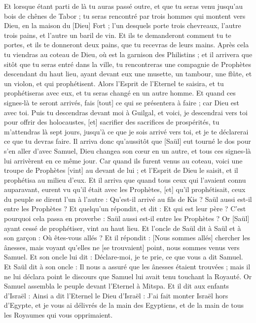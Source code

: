 \begin{multicols}{2}
Et lorsque étant parti de là tu auras passé outre, et que tu seras venu jusqu'au bois de chênes de Tabor ; tu seras rencontré par trois hommes qui montent vers Dieu, en la maison du [Dieu] Fort ; l'un desquels porte trois chevreaux, l'autre trois pains, et l'autre un baril de vin.
Et ils te demanderont comment tu te portes, et ils te donneront deux pains, que tu recevras de leurs mains.
Après cela tu viendras au coteau de Dieu, où est la garnison des Philistins ; et il arrivera que sitôt que tu seras entré dans la ville, tu rencontreras une compagnie de Prophètes descendant du haut lieu, ayant devant eux une musette, un tambour, une flûte, et un violon, et qui prophétisent.
Alors l'Esprit de l'Eternel te saisira, et tu prophétiseras avec eux, et tu seras changé en un autre homme.
Et quand ces signes-là te seront arrivés, fais [tout] ce qui se présentera à faire ; car Dieu est avec toi.
Puis tu descendras devant moi à Guilgal, et voici, je descendrai vers toi pour offrir des holocaustes, [et] sacrifier des sacrifices de prospérités, tu m'attendras là sept jours, jusqu'à ce que je sois arrivé vers toi, et je te déclarerai ce que tu devras faire.
Il arriva donc qu'aussitôt que [Saül] eut tourné le dos pour s'en aller d'avec Samuel, Dieu changea son cœur en un autre, et tous ces signes-là lui arrivèrent en ce même jour.
Car quand ils furent venus au coteau, voici une troupe de Prophètes [vint] au devant de lui ; et l'Esprit de Dieu le saisit, et il prophétisa au milieu d'eux.
Et il arriva que quand tous ceux qui l'avaient connu auparavant, eurent vu qu'il était avec les Prophètes, [et] qu'il prophétisait, ceux du peuple se dirent l'un à l'autre : Qu'est-il arrivé au fils de Kis ? Saül aussi est-il entre les Prophètes ?
Et quelqu'un répondit, et dit : Et qui est leur père ? C'est pourquoi cela passa en proverbe : Saül aussi est-il entre les Prophètes ?
Or [Saül] ayant cessé de prophétiser, vint au haut lieu.
Et l'oncle de Saül dit à Saül et à son garçon : Où êtes-vous allés ? Et il répondit : [Nous sommes allés] chercher les ânesses, mais voyant qu'elles ne [se trouvaient] point, nous sommes venus vers Samuel.
Et son oncle lui dit : Déclare-moi, je te prie, ce que vous a dit Samuel.
Et Saül dit à son oncle : Il nous a assuré que les ânesses étaient trouvées ; mais il ne lui déclara point le discours que Samuel lui avait tenu touchant la Royauté.
Or Samuel assembla le peuple devant l'Eternel à Mitspa.
Et il dit aux enfants d'Israël : Ainsi a dit l'Eternel le Dieu d'Israël : J'ai fait monter Israël hors d'Egypte, et je vous ai délivrés de la main des Egyptiens, et de la main de tous les Royaumes qui vous opprimaient.

\end{multicols}
